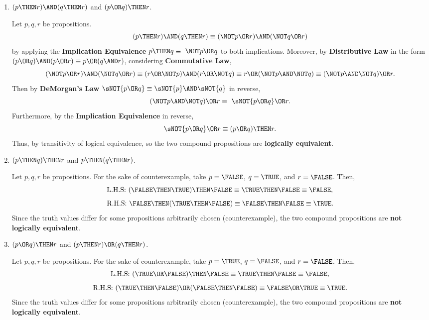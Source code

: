 \begin{enumerate}
\begin{enumerate}
    \item $(p \THEN r) \AND (q \THEN r)$ and $(p \OR q) \THEN r$.
    \begin{subprove}
      Let \(p,q,r\) be propositions. 
      \[
        (p\THEN r)\AND(q\THEN r) \equiv (\NOT p\OR r)\AND(\NOT q\OR r)
      \]
      by applying the \textbf{Implication Equivalence} \(p\THEN q\equiv~\NOT p\OR q\) to both implications.
      Moreover, by \textbf{Distributive Law} in the form \((p\OR q)\AND(p\OR r)\equiv p\OR(q\AND r)\), 
      considering \textbf{Commutative Law},
      \[
        (\NOT p\OR r)\AND(\NOT q\OR r) \equiv (r\OR \NOT p)\AND(r\OR \NOT q) \equiv r\OR(\NOT p\AND \NOT q) \equiv (\NOT p\AND\NOT q)\OR r.
      \]
      Then by \textbf{DeMorgan's Law} \(\sNOT{p\OR q}\equiv\sNOT{p}\AND\sNOT{q}\) in reverse,
      \[
        (\NOT p\AND\NOT q)\OR r\equiv~\sNOT{p\OR q}\OR r.
      \]
      Furthermore, by the \textbf{Implication Equivalence} in reverse,
      \[
        \sNOT{p\OR q}\OR r \equiv (p\OR q)\THEN r.
      \]
      Thus, by transitivity of logical equivalence, so the two compound propositions are \textbf{logically equivalent}.
    \end{subprove}

    \newpage

    \item $(p \THEN q) \THEN r$ and $p \THEN (q \THEN r)$.
    \begin{subprove}
      Let \(p,q,r\) be propositions. For the sake of counterexample, 
      take \(p=\FALSE\), \(q=\TRUE\), and \(r=\FALSE\). Then, 
      \[
        \text{L.H.S: }(\FALSE\THEN\TRUE)\THEN\FALSE \equiv \TRUE\THEN\FALSE \equiv \FALSE,
      \]
      \[
        \text{R.H.S: }\FALSE\THEN(\TRUE\THEN\FALSE) \equiv \FALSE\THEN\FALSE \equiv \TRUE.
      \]
      Since the truth values differ for some propositions arbitrarily chosen (counterexample), the two compound propositions are \textbf{not logically equivalent}.
    \end{subprove}

    \item $(p \OR q) \THEN r$ and $(p \THEN r) \OR (q \THEN r)$.
    \begin{subprove}
      Let \(p,q,r\) be propositions. For the sake of counterexample, 
      take $p=\TRUE$, $q=\FALSE$, and $r=\FALSE$. Then, 
      \[
        \text{L.H.S: }(\TRUE\OR\FALSE)\THEN\FALSE \equiv \TRUE\THEN\FALSE \equiv \FALSE,
      \]
      \[
        \text{R.H.S: }(\TRUE\THEN\FALSE)\OR(\FALSE\THEN\FALSE) \equiv \FALSE\OR\TRUE \equiv \TRUE.
      \]
      Since the truth values differ for some propositions arbitrarily chosen (counterexample), the two compound propositions are \textbf{not logically equivalent}.
    \end{subprove}
  \end{enumerate}







\end{enumerate}
